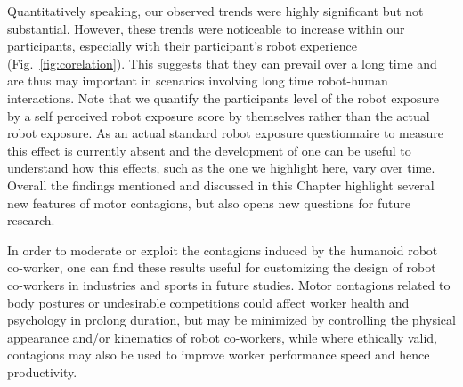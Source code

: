 Quantitatively speaking, our observed trends were highly significant but not substantial. However, these trends were noticeable to increase within our participants, especially with their participant's robot experience (Fig.~\ref{fig:corelation}). This suggests that they can prevail over a long time and are thus may important in scenarios involving long time robot-human interactions. Note that we quantify the participants level of the robot exposure by a self perceived robot exposure score by themselves rather than the actual robot exposure. As an actual standard robot exposure questionnaire to measure this effect is currently absent and the development of one can be useful to understand how this effects, such as the one we highlight here, vary over time. Overall the findings mentioned and discussed in this Chapter highlight several new features of motor contagions, but also opens new questions for future research.


In order to moderate or exploit the contagions induced by the humanoid robot co-worker, one can find these results useful for customizing the design of robot co-workers in industries and sports in future studies. Motor contagions related to body postures or undesirable competitions could affect worker health and psychology in prolong duration, but may be minimized by controlling the physical appearance and/or kinematics of robot co-workers, while where ethically valid, contagions may also be used to improve worker performance speed and hence productivity.


\clearpage







